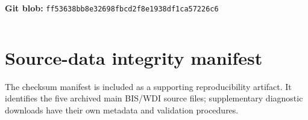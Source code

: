 \documentclass[10pt]{article}
\begin{document}
\noindent\textbf{Git blob:} \texttt{ff53638bb8e32698fbcd2f8e1938df1ca57226c6}

\inputminted[linenos,fontsize=\scriptsize,breaklines,breakanywhere]{yaml}{.github/workflows/reproducibility.yml}


\clearpage
\section*{Source-data integrity manifest}
The checksum manifest is included as a supporting reproducibility artifact. It identifies the five archived main BIS/WDI source files; supplementary diagnostic downloads have their own metadata and validation procedures.

\inputminted[linenos,fontsize=\scriptsize,breaklines]{text}{data/raw.sha256}
\end{document}
